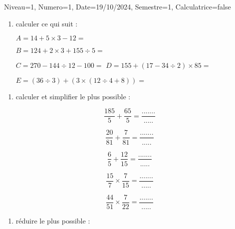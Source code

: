 \documentclass[a4paper,12pt]{article}
\begin{document}
\begin{Maquette}[DS]{Niveau=1, Numero=1, Date=19/10/2024, Semestre=1, Calculatrice=false}
\begin{exercice}
\begin{multicols}{2}
\begin{enumerate}
		\item calculer ce qui suit :
		
      $ A=14+5\times 3-12=$\anserline[3]

    $ B=124+2\times 3+155\div 5=$\anserline[3]

    $ C=270-144\div 12-100=$\anserline[3]
\columnbreak
    $ D=155+(17-34\div 2)\times 85=$\anserline[3]

      $ E=(36\div 3)+(3\times(12\div 4+8))=$\anserline[3]

	

	\end{enumerate}
	\end{multicols}
  	
\end{exercice}

\begin{exercice}
	\begin{enumerate}
		\item calculer et simplifier le plus possible :
		\end{enumerate}
\begin{multicols}{2}		

\[\dfrac{185}{5}+\dfrac{65}{5}=\dfrac{.......}{.....}\]

\[\dfrac{20}{81}+\dfrac{7}{81}=\dfrac{.......}{.....}\]

\[\dfrac{6}{5}+\dfrac{12}{15}=\dfrac{.......}{.....}\]

\[\dfrac{15}{7}\times \dfrac{7}{15}=\dfrac{.......}{.....}\]

\[\dfrac{44}{51}\times\dfrac{7}{22}=\dfrac{.......}{.....}\]

\end{multicols}




	
	
	
\end{exercice}

\begin{exercice}
\begin{enumerate}
		\item réduire le plus possible :
		

\end{enumerate}
\end{exercice}
\end{Maquette}
\end{document}
